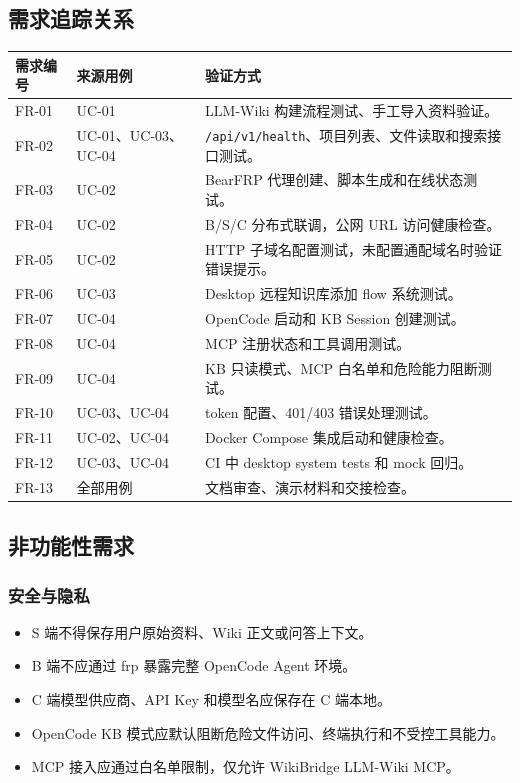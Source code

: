 \documentclass[UTF8,a4paper,12pt,fontset=fandol]{ctexart}
\newcommand{\code}[1]{\begingroup\urlstyle{tt}\footnotesize\nolinkurl{#1}\endgroup}
\begin{document}
\subsection{需求追踪关系}
\begin{longtable}{>{\centering\arraybackslash}p{1.8cm}p{3.6cm}p{8.7cm}}
\toprule
需求编号 & 来源用例 & 验证方式 \\
\midrule
FR-01 & UC-01 & LLM-Wiki 构建流程测试、手工导入资料验证。 \\
FR-02 & UC-01、UC-03、UC-04 & \code{/api/v1/health}、项目列表、文件读取和搜索接口测试。 \\
FR-03 & UC-02 & BearFRP 代理创建、脚本生成和在线状态测试。 \\
FR-04 & UC-02 & B/S/C 分布式联调，公网 URL 访问健康检查。 \\
FR-05 & UC-02 & HTTP 子域名配置测试，未配置通配域名时验证错误提示。 \\
FR-06 & UC-03 & Desktop 远程知识库添加 flow 系统测试。 \\
FR-07 & UC-04 & OpenCode 启动和 KB Session 创建测试。 \\
FR-08 & UC-04 & MCP 注册状态和工具调用测试。 \\
FR-09 & UC-04 & KB 只读模式、MCP 白名单和危险能力阻断测试。 \\
FR-10 & UC-03、UC-04 & token 配置、401/403 错误处理测试。 \\
FR-11 & UC-02、UC-04 & Docker Compose 集成启动和健康检查。 \\
FR-12 & UC-03、UC-04 & CI 中 desktop system tests 和 mock 回归。 \\
FR-13 & 全部用例 & 文档审查、演示材料和交接检查。 \\
\bottomrule
\end{longtable}

\subsection{非功能性需求}
\subsubsection{安全与隐私}
\begin{itemize}
  \item S 端不得保存用户原始资料、Wiki 正文或问答上下文。
  \item B 端不应通过 frp 暴露完整 OpenCode Agent 环境。
  \item C 端模型供应商、API Key 和模型名应保存在 C 端本地。
  \item OpenCode KB 模式应默认阻断危险文件访问、终端执行和不受控工具能力。
  \item MCP 接入应通过白名单限制，仅允许 WikiBridge LLM-Wiki MCP。
\end{itemize}
\end{document}
